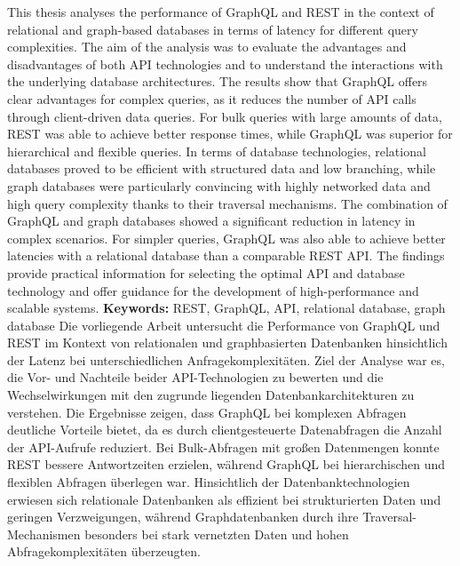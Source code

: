 \label{sec:abstract}
This thesis analyses the performance of GraphQL and REST in the context of relational and graph-based databases in terms of latency for different query complexities. The aim of the analysis was to evaluate the advantages and disadvantages of both API technologies and to understand the interactions with the underlying database architectures.
\newline
\noindent
The results show that GraphQL offers clear advantages for complex queries, as it reduces the number of API calls through client-driven data queries.
For bulk queries with large amounts of data, REST was able to achieve better response times, while GraphQL was superior for hierarchical and flexible queries.
In terms of database technologies, relational databases proved to be efficient with structured data and low branching, while graph databases were particularly convincing with highly networked data and high query complexity thanks to their traversal mechanisms.
\newline
\noindent
The combination of GraphQL and graph databases showed a significant reduction in latency in complex scenarios. For simpler queries, GraphQL was also able to achieve better latencies with a relational database than a comparable REST API. The findings provide practical information for selecting the optimal API and database technology and offer guidance for the development of high-performance and scalable systems.
\newline
\noindent
\textbf{Keywords:} REST, GraphQL, API, relational database, graph database
\newpage
{} %
\label{sec:zusammenfassung}
Die vorliegende Arbeit untersucht die Performance von GraphQL und REST im Kontext von relationalen und graphbasierten Datenbanken hinsichtlich der Latenz bei unterschiedlichen Anfragekomplexitäten. Ziel der Analyse war es, die Vor- und Nachteile beider API-Technologien zu bewerten und die Wechselwirkungen mit den zugrunde liegenden Datenbankarchitekturen zu verstehen.
\newline
\noindent
Die Ergebnisse zeigen, dass GraphQL bei komplexen Abfragen deutliche Vorteile bietet, da es durch clientgesteuerte Datenabfragen die Anzahl der API-Aufrufe reduziert.
Bei Bulk-Abfragen mit großen Datenmengen konnte REST bessere Antwortzeiten erzielen, während GraphQL bei hierarchischen und flexiblen Abfragen überlegen war.
Hinsichtlich der Datenbanktechnologien erwiesen sich relationale Datenbanken als effizient bei strukturierten Daten und geringen Verzweigungen, während Graphdatenbanken durch ihre Traversal-Mechanismen besonders bei stark vernetzten Daten und hohen Abfragekomplexitäten überzeugten.
